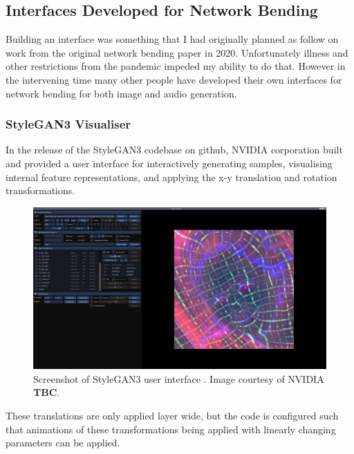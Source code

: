 \subsection{Interfaces Developed for Network Bending}

Building an interface was something that I had originally planned as follow on work from the original network bending paper in 2020. 
Unfortunately illness and other restrictions from the pandemic impeded my ability to do that. 
However in the intervening time many other people have developed their own interfaces for network bending for both image and audio generation.

\subsubsection{StyleGAN3 Visualiser}

In the release of the StyleGAN3 codebase on github, NVIDIA corporation built and provided a user interface for interactively generating samples, visualising internal feature representations, and applying the x-y translation and rotation transformations. 

\begin{figure}[!htb]
    \centering
    \captionsetup{justification=centering}
    \includegraphics[width=1\textwidth]{figures/c7_impact/net-bend-technical/stylegan3-vis-interface.png}
    \caption[StyleGAN3 user interface]{Screenshot of StyleGAN3 user interface \citep{karras2021alias}. Image courtesy of NVIDIA \textbf{TBC}.}
    \label{fig:c7:stylegan3-interface}
\end{figure}


These translations are only applied layer wide, but the code is configured such that animations of these transformations being applied with linearly changing parameters can be applied. 

